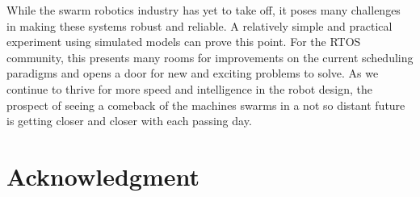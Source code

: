 \documentclass[journal]{IEEEtran}
\begin{document}
While the swarm robotics industry has yet to take off, it poses many challenges in making these systems robust and reliable. A relatively simple and practical experiment using simulated models can prove this point.
For the RTOS community, this presents many rooms for improvements on the current scheduling paradigms and opens a door for new and exciting problems to solve. As we continue to thrive for more speed and intelligence in the robot design, the prospect of seeing a comeback of the machines swarms in a not so distant future is getting closer and closer with each passing day.

\section{Acknowledgment}
\end{document}
